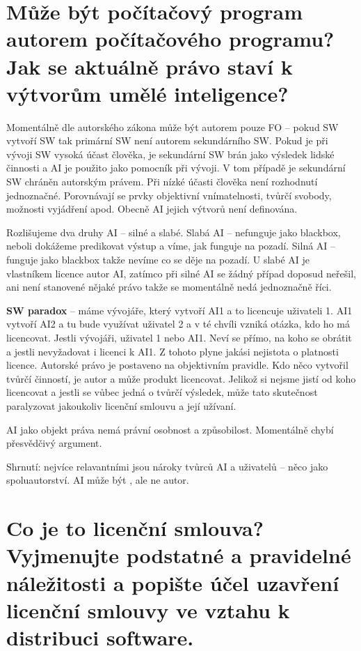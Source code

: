 \section{Může být počítačový program autorem počítačového programu? Jak se aktuálně právo staví k výtvorům umělé inteligence?}

Momentálně dle autorského zákona může být autorem pouze FO -- pokud SW vytvoří SW tak primární SW není autorem sekundárního SW. Pokud je při vývoji SW vysoká účast člověka, je sekundární SW brán jako výsledek lidské činnosti a AI je použito jako pomocník při vývoji. V tom případě je sekundární SW chráněn autorským právem. Při nízké účasti člověka není rozhodnutí jednoznačné. Porovnávají se prvky objektivní vnímatelnosti, tvůrčí svobody, možnosti vyjádření apod. Obecně AI jejich výtvorů není definována. 

Rozlišujeme dva druhy AI -- silné a slabé. Slabá AI -- nefunguje jako blackbox, neboli dokážeme predikovat výstup a víme, jak funguje na pozadí. Silná AI -- funguje jako blackbox takže nevíme co se děje na pozadí. U slabé AI je vlastníkem licence autor AI, zatímco při silné AI se žádný případ doposud neřešil, ani není stanovené nějaké právo takže se momentálně nedá jednoznačně říci.

\textbf{SW paradox} -- máme vývojáře, který vytvoří AI1 a to licencuje uživateli 1. AI1 vytvoří AI2 a tu bude využívat uživatel 2 a v té chvíli vzniká otázka, kdo ho má licencovat. Jestli vývojáři, uživatel 1 nebo AI1. Neví se přímo, na koho se obrátit a jestli nevyžadovat i licenci k AI1. Z tohoto plyne jakási nejistota o platnosti licence. Autorské právo je postaveno na objektivním pravidle. Kdo něco vytvořil tvůrčí činností, je autor a může produkt licencovat. Jelikož si nejsme jistí od koho licencovat a jestli se vůbec jedná o tvůrčí výsledek, může tato skutečnost paralyzovat jakoukoliv licenční smlouvu a její užívaní.

AI jako objekt práva nemá právní osobnost a způsobilost. Momentálně chybí přesvědčivý argument. 

Shrnutí: nejvíce relavantními jsou nároky tvůrců AI a uživatelů -- něco jako spoluautorství. AI může být , ale ne autor.

\newpage
\section{Co je to licenční smlouva? Vyjmenujte podstatné a pravidelné náležitosti a popište účel uzavření licenční smlouvy ve vztahu k distribuci software.}


